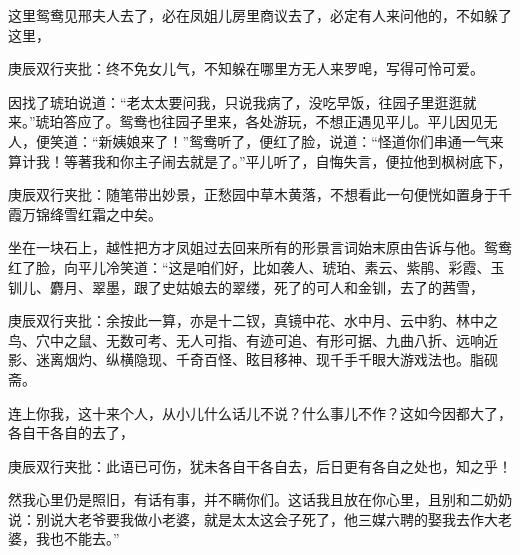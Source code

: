 \begin{parag}
    这里鸳鸯见邢夫人去了，必在凤姐儿房里商议去了，必定有人来问他的，不如躲了这里，\begin{note}庚辰双行夹批：终不免女儿气，不知躲在哪里方无人来罗唣，写得可怜可爱。\end{note}因找了琥珀说道：“老太太要问我，只说我病了，没吃早饭，往园子里逛逛就来。”琥珀答应了。鸳鸯也往园子里来，各处游玩，不想正遇见平儿。平儿因见无人，便笑道：“新姨娘来了！”鸳鸯听了，便红了脸，说道：“怪道你们串通一气来算计我！等著我和你主子闹去就是了。”平儿听了，自悔失言，便拉他到枫树底下，\begin{note}庚辰双行夹批：随笔带出妙景，正愁园中草木黄落，不想看此一句便恍如置身于千霞万锦绛雪红霜之中矣。\end{note}坐在一块石上，越性把方才凤姐过去回来所有的形景言词始末原由告诉与他。鸳鸯红了脸，向平儿冷笑道：“这是咱们好，比如袭人、琥珀、素云、紫鹃、彩霞、玉钏儿、麝月、翠墨，跟了史姑娘去的翠缕，死了的可人和金钏，去了的茜雪，\begin{note}庚辰双行夹批：余按此一算，亦是十二钗，真镜中花、水中月、云中豹、林中之鸟、穴中之鼠、无数可考、无人可指、有迹可追、有形可据、九曲八折、远响近影、迷离烟灼、纵横隐现、千奇百怪、眩目移神、现千手千眼大游戏法也。脂砚斋。\end{note}连上你我，这十来个人，从小儿什么话儿不说？什么事儿不作？这如今因都大了，各自干各自的去了，\begin{note}庚辰双行夹批：此语已可伤，犹未各自干各自去，后日更有各自之处也，知之乎！\end{note}然我心里仍是照旧，有话有事，并不瞒你们。这话我且放在你心里，且别和二奶奶说：别说大老爷要我做小老婆，就是太太这会子死了，他三媒六聘的娶我去作大老婆，我也不能去。”
\end{parag}


